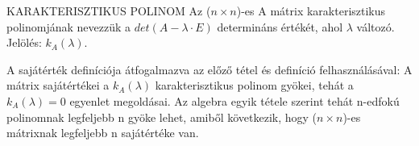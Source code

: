 \begin{definicio}{KARAKTERISZTIKUS POLINOM}
Az ($n \times n$)-es A mátrix karakterisztikus polinomjának nevezzük a $det(A - \lambda\cdot E)$ determináns értékét, ahol $\lambda$ változó.\\
Jelölés: $k_A(\lambda)$.
\end{definicio}

A sajátérték definíciója átfogalmazva az előző tétel és definíció felhasználásával: A mátrix sajátértékei a $k_A(\lambda)$ karakterisztikus polinom gyökei, tehát a $k_A(\lambda) = 0$ egyenlet megoldásai. Az algebra egyik tétele szerint tehát n-edfokú polinomnak legfeljebb n gyöke lehet, amiből következik, hogy ($n \times n$)-es mátrixnak legfeljebb n sajátértéke van.
